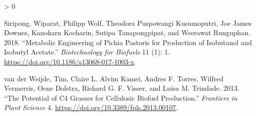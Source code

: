 \documentclass[
]{book}
\newlength{\cslhangindent}
\newenvironment{CSLReferences}[2] %
 {%
  \setlength{\parindent}{0pt}
  \ifodd #1 \everypar{\setlength{\hangindent}{\cslhangindent}}\ignorespaces\fi
  \ifnum #2 > 0
  \setlength{\parskip}{#2\baselineskip}
  \fi
 }%
 {}
\begin{document}
\begin{CSLReferences}{1}{0}
\leavevmode\hypertarget{ref-siripong2018}{}%
Siripong, Wiparat, Philipp Wolf, Theodora Puspowangi Kusumoputri, Joe James Downes, Kanokarn Kocharin, Sutipa Tanapongpipat, and Weerawat Runguphan. 2018. {``Metabolic Engineering of {Pichia} Pastoris for Production of Isobutanol and Isobutyl Acetate.''} \emph{Biotechnology for Biofuels} 11 (1): 1. \url{https://doi.org/10.1186/s13068-017-1003-x}.

\leavevmode\hypertarget{ref-vanderweijde2013}{}%
van der Weijde, Tim, Claire L. Alvim Kamei, Andres F. Torres, Wilfred Vermerris, Oene Dolstra, Richard G. F. Visser, and Luisa M. Trindade. 2013. {``The Potential of {C4} Grasses for Cellulosic Biofuel Production.''} \emph{Frontiers in Plant Science} 4. \url{https://doi.org/10.3389/fpls.2013.00107}.

\end{CSLReferences}
\end{document}
